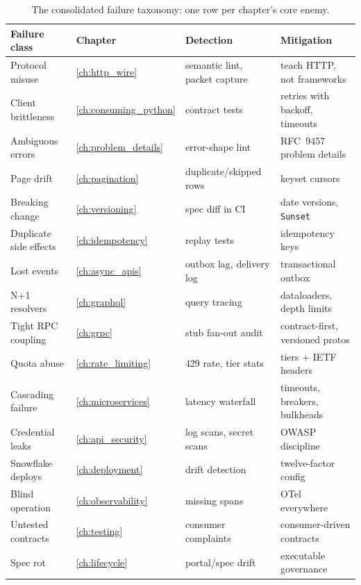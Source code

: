 \begin{table}[htbp]
  \centering
  \small
  \begin{tabularx}{\textwidth}{l l X X}
    \toprule
    \textbf{Failure class} & \textbf{Chapter} & \textbf{Detection} & \textbf{Mitigation} \\
    \midrule
    Protocol misuse & \ref{ch:http_wire} & semantic lint, packet capture & teach HTTP, not frameworks \cite{rfc9110} \\
    Client brittleness & \ref{ch:consuming_python} & contract tests & retries with backoff, timeouts \cite{httpxdocs} \\
    Ambiguous errors & \ref{ch:problem_details} & error-shape lint & RFC~9457 problem details \cite{rfc9457} \\
    Page drift & \ref{ch:pagination} & duplicate/skipped rows & keyset cursors \\
    Breaking change & \ref{ch:versioning} & spec diff in CI & date versions, \texttt{Sunset} \cite{rfc8594} \\
    Duplicate side effects & \ref{ch:idempotency} & replay tests & idempotency keys \\
    Lost events & \ref{ch:async_apis} & outbox lag, delivery log & transactional outbox \cite{kleppmann2017ddia} \\
    N+1 resolvers & \ref{ch:graphql} & query tracing & dataloaders, depth limits \\
    Tight RPC coupling & \ref{ch:grpc} & stub fan-out audit & contract-first, versioned protos \\
    Quota abuse & \ref{ch:rate_limiting} & 429 rate, tier stats & tiers + IETF headers \cite{ietf_ratelimit_headers} \\
    Cascading failure & \ref{ch:microservices} & latency waterfall & timeouts, breakers, bulkheads \cite{nygard2018releaseit} \\
    Credential leaks & \ref{ch:api_security} & log scans, secret scans & OWASP discipline \cite{owaspapisecurity} \\
    Snowflake deploys & \ref{ch:deployment} & drift detection & twelve-factor config \cite{twelvefactor} \\
    Blind operation & \ref{ch:observability} & missing spans & OTel everywhere \cite{opentelemetrydocs} \\
    Untested contracts & \ref{ch:testing} & consumer complaints & consumer-driven contracts \cite{pactdocs} \\
    Spec rot & \ref{ch:lifecycle} & portal/spec drift & executable governance \cite{openapi31,asyncapi} \\
    \bottomrule
  \end{tabularx}
  \caption{The consolidated failure taxonomy: one row per chapter's core
  enemy.}
  \label{tab:failure-taxonomy}
\end{table}

